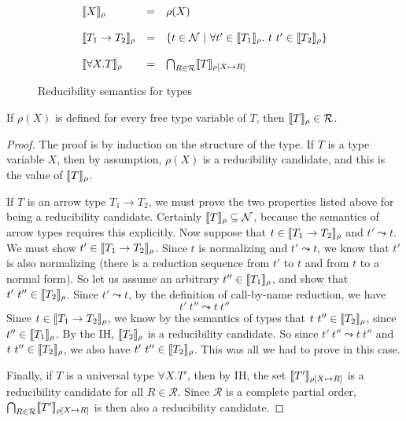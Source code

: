 \documentclass{article}
\begin{document}
\begin{figure}
\[
\begin{array}{lll}
\llbracket X \rrbracket_\rho & = & \rho(X) \\ \\
\llbracket T_1 \to T_2 \rrbracket_\rho & = & \{ t \in \mathcal{N}\ |\ \forall t'\in\llbracket T_1 \rrbracket_\rho.\ t\ t'\in\llbracket T_2 \rrbracket_\rho \} \\ \\
\llbracket \forall X.T \rrbracket_\rho & = & \bigcap_{R\in\mathcal{R}} \llbracket T \rrbracket_{\rho[X\mapsto R]} 
\end{array}
\]
\caption{Reducibility semantics for types}
\label{fig:semtp}
\end{figure}

\begin{lemma}
\label{lem:semred}
  If $\rho(X)$ is defined for every free type variable of $T$, then
  $\llbracket T \rrbracket_\rho \in \mathcal{R}$.
\end{lemma}
\begin{proof}
  The proof is by induction on the structure of the type.  If $T$ is a
  type variable $X$, then by assumption, $\rho(X)$ is a reducibility
  candidate, and this is the value of $\llbracket T \rrbracket_\rho$.

  If $T$ is an arrow type $T_1 \to T_2$, we must prove the two
  properties listed above for being a reducibility candidate.
  Certainly $\llbracket T \rrbracket_\rho\subseteq\mathcal{N}$, because the
  semantics of arrow types requires this explicitly.  Now suppose that
  $t\in\llbracket T_1\to T_2 \rrbracket_\rho$ and $t'\leadsto t$.  We must show
  $t'\in\llbracket T_1\to T_2 \rrbracket_\rho$.  Since $t$ is normalizing and
  $t'\leadsto t$, we know that $t'$ is also normalizing (there is a
  reduction sequence from $t'$ to $t$ and from $t$ to a normal form).
  So let us assume an arbitrary $t''\in\llbracket T_1 \rrbracket_\rho$, and show
  that $t'\ t''\in\llbracket T_2 \rrbracket_\rho$.  Since $t' \leadsto t$, by the
  definition of call-by-name reduction, we have
\[
t'\ t'' \leadsto t\ t''
\]
Since $t\in\llbracket T_1\to T_2 \rrbracket_\rho$, we know by the semantics of
types that $t\ t''\in\interp{T_2}_\rho$, since
$t''\in\llbracket T_1 \rrbracket_\rho$.  By the IH, $\llbracket T_2 \rrbracket_\rho$ is a
reducibility candidate.  So since $t'\ t''\leadsto t\ t''$ and $t\
t''\in\llbracket T_2 \rrbracket_\rho$, we also have $t'\ t''\in\llbracket T_2 \rrbracket_\rho$.
This was all we had to prove in this case.

Finally, if $T$ is a universal type $\forall X.T'$, then by IH, the
set $\llbracket T' \rrbracket_{\rho[X\mapsto R]}$ is a reducibility candidate for
all $R\in\mathcal{R}$.  Since $\mathcal{R}$ is a complete partial
order, $\bigcap_{R\in\mathcal{R}}\llbracket T' \rrbracket_{\rho[X\mapsto R]}$ is
then also a reducibility candidate.

\end{proof}
\end{document}

